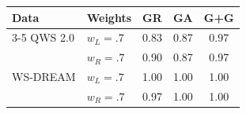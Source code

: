 \begin{tabular}{llccc}
\toprule
Data & Weights & GR & GA & G+G \\
\cmidrule(lr){3-5}
\midrule
QWS 2.0 & $w_L=.7$ & 0.83 & 0.87 & 0.97 \\
 & $w_R=.7$ & 0.90 & 0.87 & 0.97 \\
\midrule
WS-DREAM & $w_L=.7$ & 1.00 & 1.00 & 1.00 \\
 & $w_R=.7$ & 0.97 & 1.00 & 1.00 \\
\bottomrule
\end{tabular}
